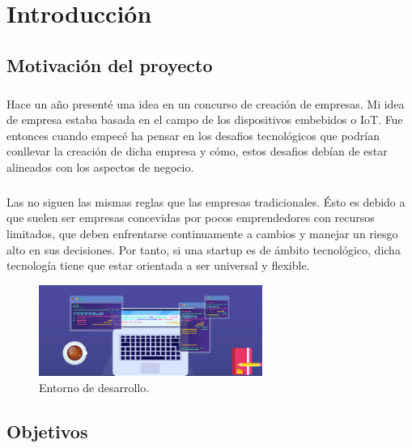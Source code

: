\chapter{Introducción}\label{sec:introduccion}



\section{Motivación del proyecto}

\paragraph{}Hace un año presenté una idea en un concurso de creación de empresas. Mi
idea de empresa estaba basada en el campo de los dispositivos embebidos o IoT. Fue
entonces cuando empecé ha pensar en los desafios tecnológicos que podrían conllevar la
creación de dicha empresa y cómo, estos desafios debían de estar alineados con los
aspectos de negocio.

\paragraph{}Las  no siguen las mismas reglas que las empresas tradicionales.
Ésto es debido a que suelen ser empresas concevidas por pocos emprendedores con recursos
limitados, que deben enfrentarse continuamente a cambios y manejar un riesgo alto en
sus decisiones. Por tanto, si una \gls{startup} es de ámbito tecnológico, dicha tecnología tiene
que estar orientada a ser universal y flexible.

\hfill \break

\begin{figure}[ht]
    \centering
    \includegraphics[width=0.65\textwidth]{imgs/dev-env.jpg}
    \caption{Entorno de desarrollo.}
    \label{fig:dev-env}
\end{figure}

\hfill \break

\section{Objetivos}

